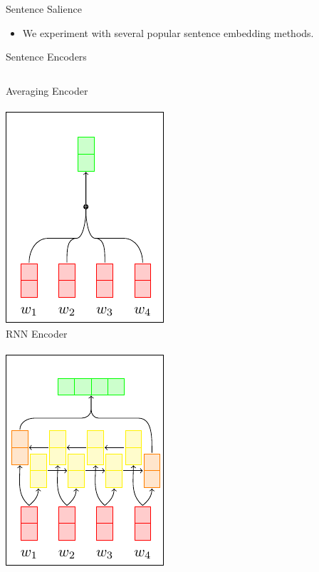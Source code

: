 \begin{frame}{Sentence Salience}

    \begin{itemize}
        \item We experiment with several popular sentence embedding methods.
    \end{itemize}

\end{frame}


\begin{frame}{Sentence Encoders}
 \begin{columns}[t]
   \centering
   Averaging Encoder\\~\\
   \includegraphics[]{images/section3/avg_encoder.pdf}\\
   \centering
   RNN Encoder\\~\\
   \includegraphics[]{images/section3/rnn_encoder.pdf}\\

\end{columns}
\end{frame}
